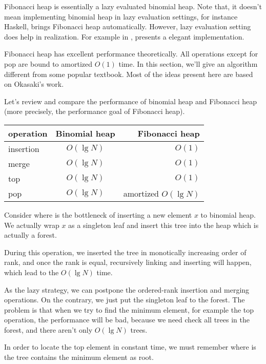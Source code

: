 \documentclass{article}
\begin{document}
Fibonacci heap is essentially a lazy evaluated binomial heap. Note
that, it doesn't mean implementing binomial heap in lazy evaluation
settings, for instance Haskell, brings Fibonacci heap automatically.
However, lazy evaluation setting does help in realization. For example
in \cite{hackage-fibq}, presents a elegant implementation.

Fibonacci heap has excellent performance theoretically. All operations
except for pop are bound to amortized $O(1)$ time. In this section,
we'll give an algorithm different from some popular textbook\cite{CLRS}.
Most of the ideas present here are based on Okasaki's work\cite{okasaki-fibh}.

Let's review and compare the performance of binomial heap and Fibonacci
heap (more precisely, the performance goal of Fibonacci heap).

\begin{tabular}{l | c | r}
  \hline
  operation & Binomial heap & Fibonacci heap \\
  \hline
  insertion & $O(\lg N)$ & $O(1)$ \\
  merge & $O(\lg N)$ & $O(1)$ \\
  top & $O(\lg N)$ & $O(1)$ \\
  pop & $O(\lg N)$ & amortized $O(\lg N)$ \\
  \hline
\end{tabular}

Consider where is the bottleneck of inserting a new element $x$ to 
binomial heap. We actually wrap $x$ as a singleton leaf and insert 
this tree into the heap which is actually a forest. 

During this operation, we inserted the tree in 
monotically increasing order of rank, and once the rank is equal,
recursively linking and inserting will happen, which lead to the
$O(\lg N)$ time.

As the lazy strategy, we can postpone the ordered-rank insertion and
merging operations. On the contrary, we just put the singleton
leaf to the forest. The problem is that when we try to find the
minimum element, for example the top operation, the performance
will be bad, because we need check all trees in the forest, and 
there aren't only $O(\lg N)$ trees.

In order to locate the top element in constant time, we must remember
where is the tree contains the minimum element as root.
\end{document}
